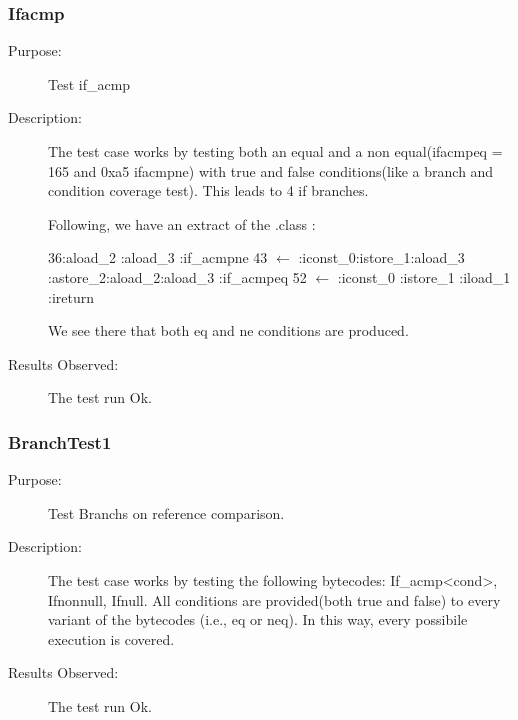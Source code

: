 \subsubsection{Ifacmp}
\begin{description}
   \item[Purpose:]
Test if\_acmp
   \item[Description:]
The test case works by testing both an equal and a non
equal(ifacmpeq = 165 and 0xa5 ifacmpne) with true and false
conditions(like a branch and condition coverage test). This leads to
4 if branches.

Following, we have an extract of the .class :

36:aload\_2 :aload\_3 :if\_acmpne       43 $
\longleftarrow $ :iconst\_0:istore\_1:aload\_3 :astore\_2:aload\_2:aload\_3        :if\_acmpeq       52 $ \longleftarrow
$ :iconst\_0        :istore\_1        :iload\_1         :ireturn         \newline

We see there that both eq and ne conditions are produced.
   \item[Results Observed:]
The test run Ok.
\end{description}


\subsubsection{BranchTest1}
\begin{description}
   \item[Purpose:]
Test Branchs on reference comparison.
   \item[Description:]
The test case works by testing the following bytecodes:
\newline If\_acmp\textless cond\textgreater, Ifnonnull, Ifnull. All
conditions are provided(both true and false) to every variant of the
bytecodes (i.e., eq or neq). In this way, every possibile execution
is covered.
  \item[Results Observed:]
The test run Ok.
\end{description}

